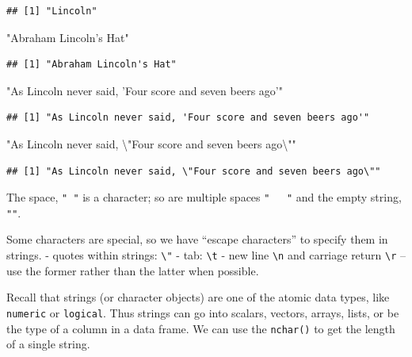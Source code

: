 \documentclass[
]{book}
\newenvironment{Shaded}{\begin{snugshade}}{\end{snugshade}}
\newcommand{\CharTok}[1]{\textcolor[rgb]{0.31,0.60,0.02}{#1}}
\newcommand{\StringTok}[1]{\textcolor[rgb]{0.31,0.60,0.02}{#1}}
\begin{document}
\begin{verbatim}
## [1] "Lincoln"
\end{verbatim}

\begin{Shaded}
\begin{Highlighting}[]
\StringTok{"Abraham Lincoln's Hat"}
\end{Highlighting}
\end{Shaded}

\begin{verbatim}
## [1] "Abraham Lincoln's Hat"
\end{verbatim}

\begin{Shaded}
\begin{Highlighting}[]
\StringTok{"As Lincoln never said, 'Four score and seven beers ago'"}
\end{Highlighting}
\end{Shaded}

\begin{verbatim}
## [1] "As Lincoln never said, 'Four score and seven beers ago'"
\end{verbatim}

\begin{Shaded}
\begin{Highlighting}[]
\StringTok{"As Lincoln never said, }\CharTok{\textbackslash{}"}\StringTok{Four score and seven beers ago}\CharTok{\textbackslash{}"}\StringTok{"}
\end{Highlighting}
\end{Shaded}

\begin{verbatim}
## [1] "As Lincoln never said, \"Four score and seven beers ago\""
\end{verbatim}

The space, \texttt{"\ "} is a character; so are multiple spaces \texttt{"\ \ \ "} and the empty string, \texttt{""}.

Some characters are special, so we have ``escape characters'' to specify them in strings.
- quotes within strings: \texttt{\textbackslash{}"}
- tab: \texttt{\textbackslash{}t}
- new line \texttt{\textbackslash{}n} and carriage return \texttt{\textbackslash{}r} -- use the former rather than the latter when possible.

Recall that strings (or character objects) are one of the atomic data types, like \texttt{numeric} or \texttt{logical}. Thus strings can go into scalars, vectors, arrays, lists, or be the type of a column in a data frame. We can use the \texttt{nchar()} to get the length of a single string.
\end{document}
